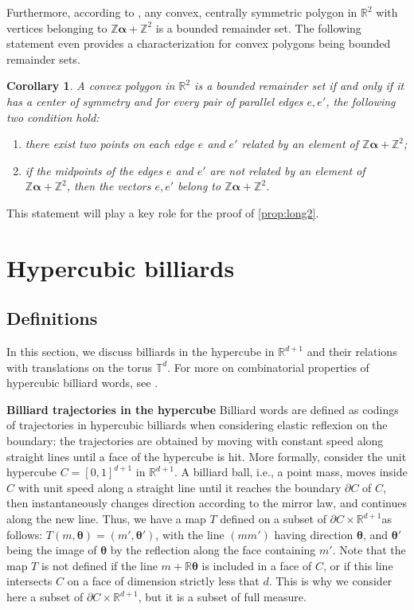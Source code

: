 \documentclass{article}
\newtheorem{corollary}[lemma]{Corollary}
\theoremstyle{definition}
\newcommand{\T}{\mathbb{T}}
\newcommand{\R}{\mathbb{R}}
\newcommand{\btheta}{\boldsymbol{\theta}}
\newcommand{\balpha}{\boldsymbol{\alpha}}
\begin{document}
Furthermore, according to  \cite[Corollary 1]{GL:15}, any convex, centrally symmetric polygon in $\R^2$  with vertices belonging to   ${\mathbb Z} \balpha+  {\mathbb Z}^2$ is a bounded remainder set.  The following statement  even provides a characterization for convex polygons being bounded remainder sets. 
\begin{corollary}\label{cor:GL} \cite[Theorem 3]{GL:15}
A convex  polygon in $\R^2$ is a bounded remainder set if and only if it has a center of symmetry and for every pair of parallel edges $e, e'$, the following  two condition hold:
\begin{enumerate}
\item there exist  two points on each edge $e$ and $e'$ related by an element of $\mathbb Z\balpha+\mathbb Z^2$;
\item if the midpoints of the edges  $e$ and $e'$ are not related by an element of $\mathbb Z\balpha+\mathbb Z^2$, then the vectors $e, e'$  belong to $\mathbb Z\balpha+\mathbb Z^2$.\end{enumerate}
\end{corollary}
This statement will play a key role for the proof of \cref{prop:long2}.




\section{Hypercubic billiards}\label{sec:defbilliard}
\subsection{Definitions}\label{subsec:hypercube}
In this section, we discuss   billiards in the hypercube in ${\mathbb R}^{d+1}$ and  their relations with   translations on the torus $\T^d$. For more on combinatorial properties of  hypercubic billiard words, see \cite{Ar.Ma.Sh.Ta.94,Ta,Bary.95,HB:07,Bed:09}.

\medskip

{\bf Billiard trajectories  in the hypercube}
Billiard words are defined  as codings of  trajectories in hypercubic billiards when considering  elastic reflexion on the boundary: the  trajectories are  obtained by moving with constant speed along straight lines until a face of the hypercube is hit.
More formally, consider the unit hypercube $C=[0,1]^{d+1}$ in $\mathbb R^{d+1}$. A billiard ball, i.e., a point mass, moves inside $C$ with unit speed along a straight line until it reaches the boundary $\partial C$ of $C$, then  instantaneously changes direction according to the mirror law, and continues along the new line. Thus, we have a map  $T$ defined on a subset of $\partial C\times \mathbb R^{d+1}$as  follows: $T(m,\btheta)=(m',\btheta')$, with the line $(mm')$ having direction $\btheta$, and  $\btheta'$ being  the image of $\btheta$ by the reflection along the face containing $m'$. Note that the map $T$  is not defined if the line $m+\mathbb R \btheta$ is included in a face of $C$, or if this line intersects $C$ on a face of dimension strictly less that $d$. This is why we consider here a  subset of $\partial C\times \mathbb R^{d+1}$, but it is a subset of full measure.
\end{document}
